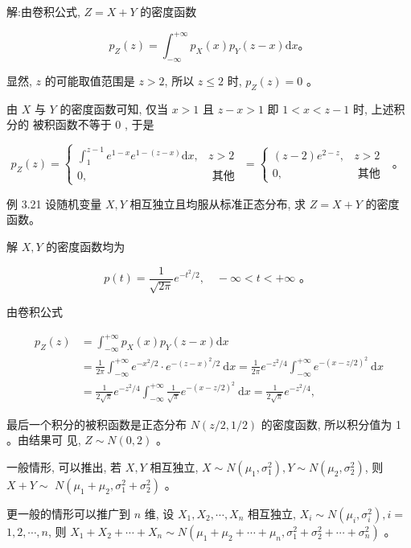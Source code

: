 \documentclass{beamer}
\begin{document}
	\begin{frame}
		解:由卷积公式, $Z=X+Y$ 的密度函数
		
		$$
		p_{Z}(z)=\int_{-\infty}^{+\infty} p_{X}(x) p_{Y}(z-x) \mathrm{d} x 。
		$$
		
		显然, $z$ 的可能取值范围是 $z>2$, 所以 $z \leqslant 2$ 时, $p_{Z}(z)=0$ 。
		
		由 $X$ 与 $Y$ 的密度函数可知, 仅当 $x>1$ 且 $z-x>1$ 即 $1<x<z-1$ 时, 上述积分的 被积函数不等于 0 , 于是
		
		$$
		p_{Z}(z)=\left\{\begin{array}{cc}
			\int_{1}^{z-1} e^{1-x} e^{1-(z-x)} \mathrm{d} x, & z>2 \\
			0, & \text { 其他 }
		\end{array}=\left\{\begin{array}{cl}
			(z-2) e^{2-z}, & z>2 \\
			0, & \text { 其他 }
		\end{array}\right. \text { 。 }\right.
		$$
	\end{frame}
	
	\begin{frame}
		例 3.21 设随机变量 $X, Y$ 相互独立且均服从标准正态分布, 求 $Z=X+Y$ 的密度 函数。
	\end{frame}
	
	\begin{frame}
		解 $X, Y$ 的密度函数均为
		
		$$
		p(t)=\frac{1}{\sqrt{2 \pi}} e^{-t^{2} / 2}, \quad-\infty<t<+\infty \text { 。 }
		$$
		
		由卷积公式
		
		$$
		\begin{aligned}
			p_{Z}(z) & =\int_{-\infty}^{+\infty} p_{X}(x) p_{Y}(z-x) \mathrm{d} x \\
			& =\frac{1}{2 \pi} \int_{-\infty}^{+\infty} e^{-x^{2} / 2} \cdot e^{-(z-x)^{2} / 2} \mathrm{~d} x=\frac{1}{2 \pi} e^{-z^{2} / 4} \int_{-\infty}^{+\infty} e^{-(x-z / 2)^{2}} \mathrm{~d} x \\
			& =\frac{1}{2 \sqrt{\pi}} e^{-z^{2} / 4} \int_{-\infty}^{+\infty} \frac{1}{\sqrt{\pi}} e^{-(x-z / 2)^{2}} \mathrm{~d} x=\frac{1}{2 \sqrt{\pi}} e^{-z^{2} / 4},
		\end{aligned}
		$$
		
		最后一个积分的被积函数是正态分布 $N(z / 2,1 / 2)$ 的密度函数, 所以积分值为 1 。由结果可 见, $Z \sim N(0,2)$ 。
	\end{frame}
	
	\begin{frame}
		一般情形, 可以推出, 若 $X, Y$ 相互独立, $X \sim N\left(\mu_{1}, \sigma_{1}^{2}\right), Y \sim N\left(\mu_{2}, \sigma_{2}^{2}\right)$, 则 $X+Y \sim$ $N\left(\mu_{1}+\mu_{2}, \sigma_{1}^{2}+\sigma_{2}^{2}\right)$ 。
		
		更一般的情形可以推广到 $n$ 维, 设 $X_{1}, X_{2}, \cdots, X_{n}$ 相互独立, $X_{i} \sim N\left(\mu_{i}, \sigma_{i}^{2}\right), i=$ $1,2, \cdots, n$, 则 $X_{1}+X_{2}+\cdots+X_{n} \sim N\left(\mu_{1}+\mu_{2}+\cdots+\mu_{n}, \sigma_{1}^{2}+\sigma_{2}^{2}+\cdots+\sigma_{n}^{2}\right)$ 。
	\end{frame}
	
\end{document}
